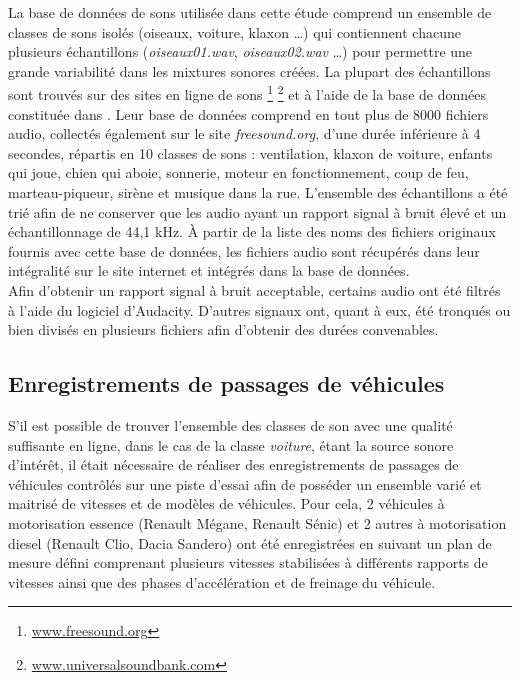 La base de données de sons utilisée dans cette étude comprend un ensemble de classes de sons isolés (oiseaux, voiture, klaxon  \dots) qui contiennent chacune plusieurs échantillons (\textit{oiseaux01.wav}, \textit{oiseaux02.wav} \dots) pour permettre une grande variabilité dans les mixtures sonores créées. La plupart des échantillons sont trouvés sur des sites en ligne de sons \footnote{\url{www.freesound.org}} \footnote{\url{www.universalsoundbank.com}} et à l'aide de la base de données constituée dans  \cite{salamon_dataset_nodate}. Leur base de données comprend en tout plus de 8000 fichiers audio, collectés également sur le site \textit{freesound.org}, d'une durée inférieure à 4 secondes, répartis en 10 classes de sons : ventilation, klaxon de voiture, enfants qui joue, chien qui aboie, sonnerie, moteur en fonctionnement, coup de feu, marteau-piqueur, sirène et musique dans la rue. L'ensemble des échantillons a été trié afin de ne conserver que les audio ayant un rapport signal à bruit élevé et un échantillonnage de 44,1 kHz. \`A partir de la liste des noms des fichiers originaux fournis avec cette base de données, les fichiers audio sont récupérés dans leur intégralité sur le site internet et intégrés dans la base de données.\\
Afin d'obtenir un rapport signal à bruit acceptable, certains audio ont été filtrés à l'aide du logiciel d'Audacity. D'autres signaux ont, quant à eux, été tronqués ou bien divisés en plusieurs fichiers afin d'obtenir des durées convenables.

\subsection{Enregistrements de passages de véhicules}\label{part:voiture_record}
S'il est possible de trouver l'ensemble des classes de son avec une qualité suffisante en ligne, dans le cas de la classe \textit{voiture}, étant la source sonore d'intérêt, il était nécessaire de réaliser des enregistrements de passages de véhicules contrôlés sur une piste d'essai afin de posséder un ensemble varié et maitrisé de vitesses et de modèles de véhicules. Pour cela, 2 véhicules à motorisation essence (Renault Mégane, Renault Sénic) et 2 autres à motorisation diesel (Renault Clio, Dacia Sandero) ont été enregistrées en suivant un plan de mesure défini comprenant plusieurs vitesses stabilisées à différents rapports de vitesses ainsi que des phases d'accélération et de freinage du véhicule.



